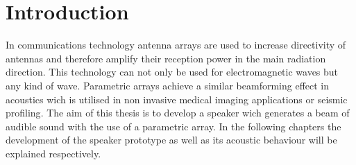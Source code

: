 \chapter{Introduction}


In communications technology antenna arrays are used to increase directivity of antennas and therefore amplify their reception power in the main radiation direction.\cite{netzberger_kommunikationstechnologie_2021-2} This technology can not only be used for electromagnetic waves but any kind of wave. Parametric arrays achieve a similar beamforming effect in acoustics wich is utilised in non invasive medical imaging applications\cite{novelline_squires_1997}\cite{konofagou_focused_2001} or seismic profiling\cite{muir_highresolution_1984}.\p
The aim of this thesis is to develop a speaker wich generates a beam of audible sound with the use of a parametric array.
In the following chapters the development of the speaker prototype as well as its acoustic behaviour will be explained respectively.